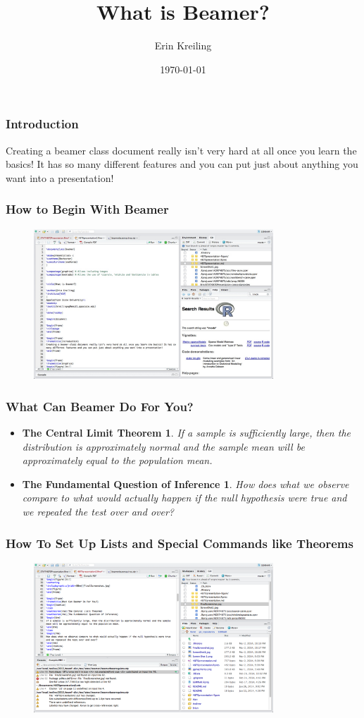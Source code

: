 \documentclass{beamer}\usepackage[]{graphicx}\usepackage[]{color}
\title{What is Beamer?}
\author{Erin Kreiling}
\institute[ASU]
{
Appalachian State University\\ 
\medskip
\textit{kreilingeg@email.appstate.edu} 
}
\date{\today}
\begin{document}
\begin{frame}
\titlepage 
\end{frame}

\begin{frame}
\frametitle{Introduction} 
Creating a beamer class document really isn't very hard at all once you learn the basics! It has so many different features and you can put just about anything you want into a presentation! 
\end{frame}


\begin{frame}
\frametitle{How to Begin With Beamer}
\begin{figure}[ht!]
\centering
\includegraphics[width=90mm]{FinalScreenshot}
\end{figure}
\end{frame}

\begin{frame}
\frametitle{What Can Beamer Do For You?}
\begin{itemize}
\item
\newtheorem{thm}{The Central Limit Theorem}
\newtheorem{rmk}{The Fundamental Question of Inference}
\begin{thm}
If a sample is sufficiently large, then the distribution is approximately normal and the sample mean will be approximately equal to the population mean.
\end{thm}
\item
\begin{rmk}
How does what we observe compare to what would actually happen if the null hypothesis were true and we repeated the test over and over?
\end{rmk}
\end{itemize}
\end{frame}

\begin{frame}
\frametitle{How To Set Up Lists and Special Commands like Theorems}
\begin{figure}[ht!]
\centering
\includegraphics[width=90mm]{Screenshot02}
\end{figure}
\end{frame}
\end{document}
